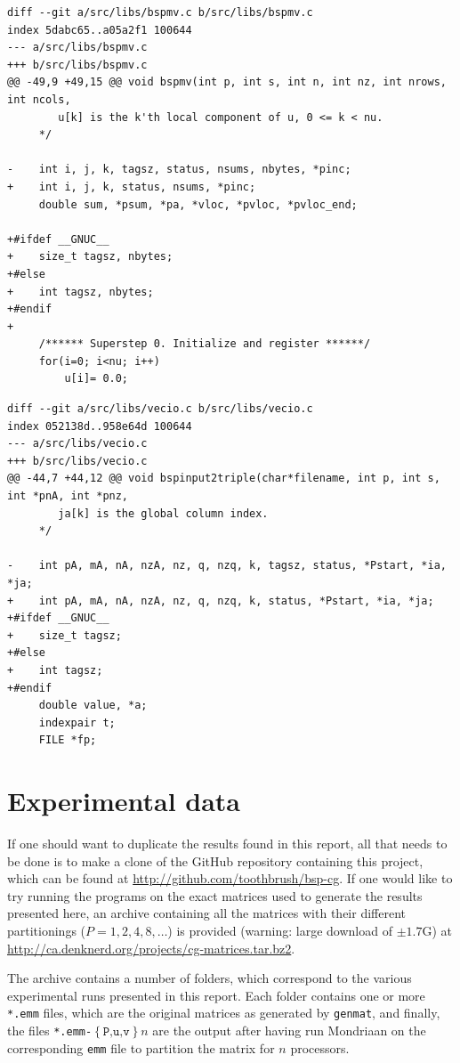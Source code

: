 \documentclass[a4paper]{article}
\begin{document}
\begin{verbatim}
diff --git a/src/libs/bspmv.c b/src/libs/bspmv.c
index 5dabc65..a05a2f1 100644
--- a/src/libs/bspmv.c
+++ b/src/libs/bspmv.c
@@ -49,9 +49,15 @@ void bspmv(int p, int s, int n, int nz, int nrows, int ncols,
        u[k] is the k'th local component of u, 0 <= k < nu.
     */
 
-    int i, j, k, tagsz, status, nsums, nbytes, *pinc;
+    int i, j, k, status, nsums, *pinc;
     double sum, *psum, *pa, *vloc, *pvloc, *pvloc_end;
 
+#ifdef __GNUC__
+    size_t tagsz, nbytes;
+#else
+    int tagsz, nbytes;
+#endif
+
     /****** Superstep 0. Initialize and register ******/
     for(i=0; i<nu; i++)
         u[i]= 0.0;
\end{verbatim}
\clearpage
\begin{verbatim}
diff --git a/src/libs/vecio.c b/src/libs/vecio.c
index 052138d..958e64d 100644
--- a/src/libs/vecio.c
+++ b/src/libs/vecio.c
@@ -44,7 +44,12 @@ void bspinput2triple(char*filename, int p, int s, int *pnA, int *pnz,
        ja[k] is the global column index.
     */
 
-    int pA, mA, nA, nzA, nz, q, nzq, k, tagsz, status, *Pstart, *ia, *ja;
+    int pA, mA, nA, nzA, nz, q, nzq, k, status, *Pstart, *ia, *ja;
+#ifdef __GNUC__
+    size_t tagsz;
+#else
+    int tagsz;
+#endif
     double value, *a;
     indexpair t;
     FILE *fp;
\end{verbatim}
\clearpage

\section{Experimental data}

If one should want to duplicate the results found in this report, all that needs to be done
is to make a clone of the GitHub repository containing this project, which can be found at
\url{http://github.com/toothbrush/bsp-cg}. If one would like to try running the programs on the exact matrices
used to generate the results presented here, an archive containing all the matrices with their
different partitionings ($P=1,2,4,8, \ldots$) is provided (warning: large
download of $\pm 1.7$G) at \url{http://ca.denknerd.org/projects/cg-matrices.tar.bz2}.

The archive contains a number of folders, which correspond to the various experimental runs
presented in this report. Each folder contains one or more \texttt{*.emm} files, which are the original
matrices as generated by \texttt{genmat}, and finally, the files \texttt{*.emm-$\left\{\texttt{P,u,v}\right\}n$} are
the output after having run Mondriaan on the corresponding \texttt{emm} file to partition the matrix for $n$ processors.
\end{document}
